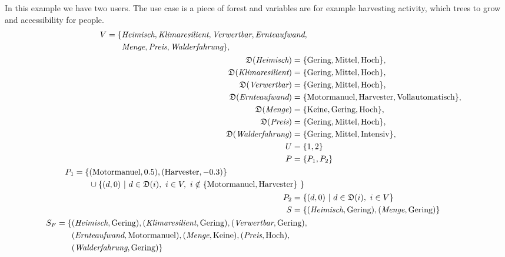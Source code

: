 \begin{mdframed}[frametitle={Forest Example}]
    In this example we have two users. The use case is a piece of forest and variables are for example harvesting activity, which trees to grow and accessibility for people.
    \begin{align}
        \begin{split}
            V = \{ & \textit{Heimisch}, \textit{Klimaresilient}, \textit{Verwertbar}, \textit{Ernteaufwand}, \\
            & \textit{Menge}, \textit{Preis}, \textit{Walderfahrung} \},
        \end{split} \notag \\
        \mathfrak{D}(\textit{Heimisch}) =  \{ & \text{Gering}, \text{Mittel}, \text{Hoch}\}, \notag \\
        \mathfrak{D}(\textit{Klimaresilient}) = \{ & \text{Gering}, \text{Mittel}, \text{Hoch}\}, \notag \\
        \mathfrak{D}(\textit{Verwertbar}) = \{ & \text{Gering}, \text{Mittel}, \text{Hoch}\}, \notag \\
        \mathfrak{D}(\textit{Ernteaufwand}) = \{ & \text{Motormanuel}, \text{Harvester}, \text{Vollautomatisch}\}, \notag \\
        \mathfrak{D}(\textit{Menge}) = \{ & \text{Keine}, \text{Gering}, \text{Hoch}\}, \notag \\
        \mathfrak{D}(\textit{Preis}) = \{ & \text{Gering}, \text{Mittel}, \text{Hoch}\}, \notag\\
        \mathfrak{D}(\textit{Walderfahrung}) = \{ & \text{Gering}, \text{Mittel}, \text{Intensiv}\},\notag \\
        U = \{ & 1,2\} \notag\\
        P = \{ & P_1, P_2\} \notag\\
        \begin{split}
            P_1 = \{ & (\text{Motormanuel}, 0.5), (\text{Harvester}, -0.3) \} \\ 
            & \cup \{ (d,0)\ |\ d \in \mathfrak{D}(i),\ i \in V,\ i \notin \{ \text{Motormanuel}, \text{Harvester}\} \ \} \ 
        \end{split} \notag \\
        P_2 = \{ & (d,0)\ |\ d \in \mathfrak{D}(i),\ i \in V \} \notag \\
        S  =  \{ & (\textit{Heimisch}, \text{Gering}), (\textit{Menge}, \text{Gering}) \} \notag \\
        \begin{split}
        S_F  =  \{ & (\textit{Heimisch}, \text{Gering}), (\textit{Klimaresilient}, \text{Gering}), (\textit{Verwertbar}, \text{Gering}), \\
        & (\textit{Ernteaufwand}, \text{Motormanuel}),
        (\textit{Menge}, \text{Keine}), (\textit{Preis}, \text{Hoch}),\\ 
        & (\textit{Walderfahrung}, \text{Gering}) \} 
        \end{split} \notag
    \end{align}
\end{mdframed}

